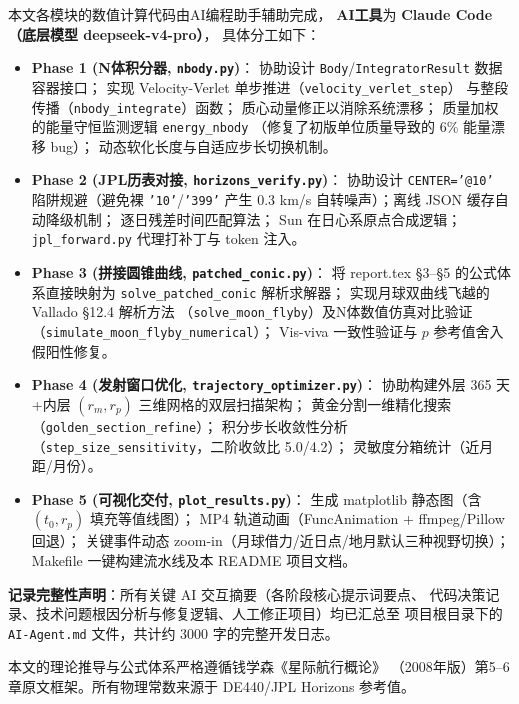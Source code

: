 \documentclass[UTF8,12pt,a4paper]{ctexart}
\begin{document}
本文各模块的数值计算代码由AI编程助手辅助完成，
\textbf{AI工具}为 \textbf{Claude Code（底层模型 deepseek-v4-pro）}，
具体分工如下：
{\raggedright\setlength{\emergencystretch}{2em}
\begin{itemize}
    \item \textbf{Phase 1 (N体积分器, \texttt{nbody.py})}：
          协助设计 \texttt{Body}/\texttt{IntegratorResult} 数据容器接口；
          实现 Velocity-Verlet 单步推进（\texttt{velocity\_verlet\_step}）
          与整段传播（\texttt{nbody\_integrate}）函数；
          质心动量修正以消除系统漂移；
          质量加权的能量守恒监测逻辑 \texttt{energy\_nbody}
          （修复了初版单位质量导致的 6\% 能量漂移 bug）；
          动态软化长度与自适应步长切换机制。
    \item \textbf{Phase 2 (JPL历表对接, \texttt{horizons\_verify.py})}：
          协助设计 \texttt{CENTER='@10'} 陷阱规避（避免裸 \texttt{'10'}/\texttt{'399'}
          产生 0.3 km/s 自转噪声）；离线 JSON 缓存自动降级机制；
          逐日残差时间匹配算法；
          Sun 在日心系原点合成逻辑；
          \texttt{jpl\_forward.py} 代理打补丁与 token 注入。
    \item \textbf{Phase 3 (拼接圆锥曲线, \texttt{patched\_conic.py})}：
          将 report.tex §3--§5 的公式体系直接映射为
          \texttt{solve\_patched\_conic} 解析求解器；
          实现月球双曲线飞越的 Vallado \cite{vallado2013} §12.4 解析方法
          （\texttt{solve\_moon\_flyby}）及N体数值仿真对比验证
          （\texttt{simulate\_moon\_flyby\_numerical}）；
          Vis-viva 一致性验证与 $p$ 参考值舍入假阳性修复。
    \item \textbf{Phase 4 (发射窗口优化, \texttt{trajectory\_optimizer.py})}：
          协助构建外层 365 天+内层 $(r_m, r_p)$ 三维网格的双层扫描架构；
          黄金分割一维精化搜索（\texttt{golden\_section\_refine}）；
          积分步长收敛性分析（\texttt{step\_size\_sensitivity}，二阶收敛比 5.0/4.2）；
          灵敏度分箱统计（近月距/月份）。
    \item \textbf{Phase 5 (可视化交付, \texttt{plot\_results.py})}：
          生成 matplotlib 静态图（含 $(t_0,r_p)$ 填充等值线图）；
          MP4 轨道动画（FuncAnimation + ffmpeg/Pillow 回退）；
          关键事件动态 zoom-in（月球借力/近日点/地月默认三种视野切换）；
          Makefile 一键构建流水线及本 README 项目文档。
\end{itemize}

\textbf{记录完整性声明}：所有关键 AI 交互摘要（各阶段核心提示词要点、
代码决策记录、技术问题根因分析与修复逻辑、人工修正项目）均已汇总至
项目根目录下的 \texttt{AI-Agent.md} 文件，共计约 3000 字的完整开发日志。
}

本文的理论推导与公式体系严格遵循钱学森《星际航行概论》%
（2008年版）第5--6章原文框架。所有物理常数来源于 DE440/JPL Horizons 参考值。

\printbibliography[title={参考文献}]
\end{document}
